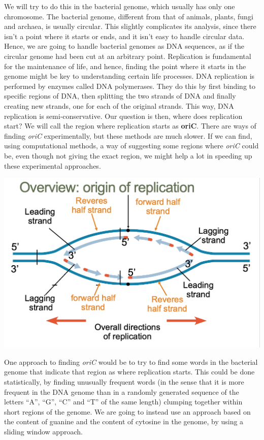 \documentclass[
]{article}
\begin{document}
We will try to do this in the bacterial genome, which usually has only
one chromosome. The bacterial genome, different from that of animals,
plants, fungi and archaea, is usually circular. This slightly
complicates its analysis, since there isn't a point where it starts or
ends, and it isn't easy to handle circular data. Hence, we are going to
handle bacterial genomes as DNA sequences, as if the circular genome had
been cut at an arbitrary point. Replication is fundamental for the
maintenance of life, and hence, finding the point where it starts in the
genome might be key to understanding certain life processes. DNA
replication is performed by enzymes called DNA polymerases. They do this
by first binding to specific regions of DNA, then splitting the two
strands of DNA and finally creating new strands, one for each of the
original strands. This way, DNA replication is semi-conservative. Our
question is then, where does replication start? We will call the region
where replication starts as \textbf{oriC}. There are ways of finding
\emph{oriC} experimentally, but these methods are much slower. If we can
find, using computational methods, a way of suggesting some regions
where \emph{oriC} could be, even though not giving the exact region, we
might help a lot in speeding up these experimental approaches.

\includegraphics{./Images/img7.jpg}

One approach to finding \emph{oriC} would be to try to find some words
in the bacterial genome that indicate that region as where replication
starts. This could be done statistically, by finding unusually frequent
words (in the sense that it is more frequent in the DNA genome than in a
randomly generated sequence of the letters ``A'', ``G'', ``C'' and ``T''
of the same length) clumping together within short regions of the
genome. We are going to instead use an approach based on the content of
guanine and the content of cytosine in the genome, by using a sliding
window approach.
\end{document}
